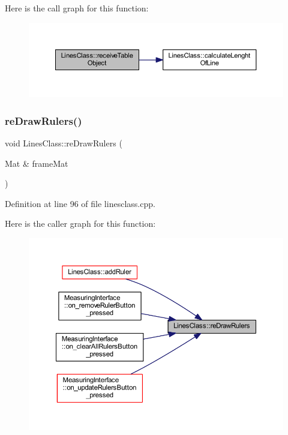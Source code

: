 Here is the call graph for this function\+:
\nopagebreak
\begin{figure}[H]
\begin{center}
\leavevmode
\includegraphics[width=350pt]{classLinesClass_a7cbdbb9847cc00cbc64141572c536866_cgraph}
\end{center}
\end{figure}
\mbox{\label{classLinesClass_a7fad9c7b48f6d55017423ffa9897b071}} 
\subsubsection{\texorpdfstring{reDrawRulers()}{reDrawRulers()}}
{\footnotesize\ttfamily void Lines\+Class\+::re\+Draw\+Rulers (\begin{DoxyParamCaption}\item[{Mat \&}]{frame\+Mat }\end{DoxyParamCaption})}



Definition at line 96 of file linesclass.\+cpp.

Here is the caller graph for this function\+:
\nopagebreak
\begin{figure}[H]
\begin{center}
\leavevmode
\includegraphics[width=350pt]{classLinesClass_a7fad9c7b48f6d55017423ffa9897b071_icgraph}
\end{center}
\end{figure}
\mbox{\label{classLinesClass_a714be78a9c85c6ba3c8456e8ee1a5290}} 
